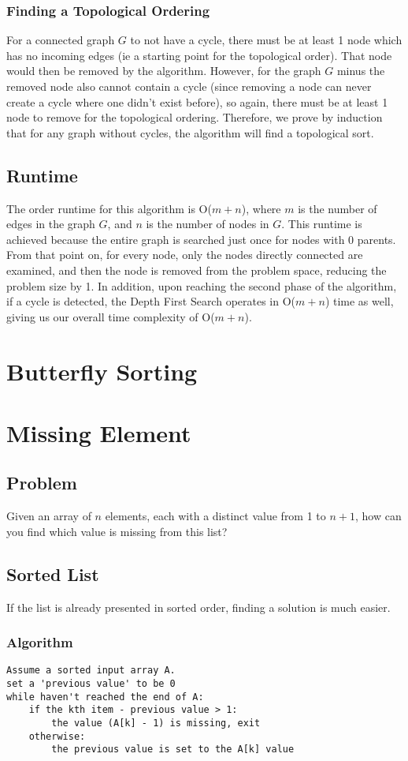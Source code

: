 \documentclass[titlepage]{article}
\numberwithin{equation}{subsection}
\begin{document}
\subsubsection{Finding a Topological Ordering}
For a connected graph $G$ to not have a cycle, there must be at 
least 1 node which has no incoming edges (ie a starting point 
for the topological order). That node would then be removed 
by the algorithm. However, for the graph $G$ minus the 
removed node also cannot contain a cycle (since removing a node
can never create a cycle where one didn't exist before), so again,
there must be at least 1 node to remove for the topological ordering.
Therefore, we prove by induction that for any graph without cycles,
the algorithm will find a topological sort.
\subsection{Runtime}
The order runtime for this algorithm is O($m + n$), where $m$ is the
number of edges in the graph $G$, and $n$ is the number of nodes in $G$.
This runtime is achieved because the entire graph is searched just once
for nodes with 0 parents. From that point on, for every node, only the nodes
directly connected are examined, and then the node is removed from the
problem space, reducing the problem size by 1. In addition, upon reaching
the second phase of the algorithm, if a cycle is detected, the Depth First Search
operates in O($m+n$) time as well, giving us our overall time complexity of
O($m+n$).
\section{Butterfly Sorting}
\section{Missing Element}
\subsection{Problem}
Given an array of $n$ elements, each with a distinct value from
1 to $n+1$, how can you find which value is missing from this list?
\subsection{Sorted List}
If the list is already presented in sorted order, finding a solution
is much easier.
\subsubsection{Algorithm}
\begin{lstlisting}
Assume a sorted input array A.
set a 'previous value' to be 0
while haven't reached the end of A:
    if the kth item - previous value > 1:
        the value (A[k] - 1) is missing, exit
    otherwise:
        the previous value is set to the A[k] value
\end{lstlisting}
\end{document}
